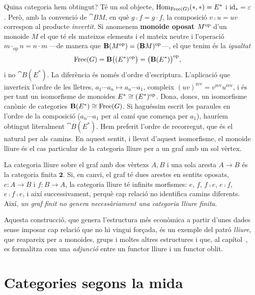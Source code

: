 \begin{exemple}
Quina categoria hem obtingut? Té un sol objecte, $\operatorname{Hom}_{\operatorname{Free}(G)}(\ast,\ast)=E^*$ i $\operatorname{id}_\ast=\varepsilon$. Però, amb la convenció de $\cat{B}M$, en què $g\comp f=g\cdot f$, la composició $v\comp u=uv$ correspon al producte \emph{invertit}. Si anomenem \textbf{monoide oposat} $M^{\mathrm{op}}$ d'un monoide $M$ el que té els mateixos elements i el mateix neutre i l'operació $m\cdot_{\mathrm{op}} n=n\cdot m$ ---de manera que $\mathbf{B}(M^{\mathrm{op}})=(\mathbf{B}M)^{\mathrm{op}}$---, el que tenim és la \emph{igualtat}
\[
\operatorname{Free}(G)=\mathbf{B}\bigl((E^*)^{\mathrm{op}}\bigr)=\bigl(\mathbf{B}(E^*)\bigr)^{\mathrm{op}},
\]
i no $\cat{B}(E^*)$. La diferència és només d'ordre d'escriptura. L'aplicació que inverteix l'ordre de les lletres, $a_1\cdots a_n\mapsto a_n\cdots a_1$, compleix $(uv)^{\mathrm{rev}}=v^{\mathrm{rev}}u^{\mathrm{rev}}$, i és per tant un isomorfisme de monoides $E^*\cong(E^*)^{\mathrm{op}}$. Dona, doncs, un isomorfisme canònic de categories $\mathbf{B}(E^*)\cong\operatorname{Free}(G)$. Si haguéssim escrit les paraules en l'ordre de la composició ($a_n\cdots a_1$ per al camí que comença per $a_1$), hauríem obtingut literalment $\cat{B}(E^*)$. Hem preferit l'ordre de recorregut, que és el natural per als camins. En aquest sentit, i llevat d'aquest isomorfisme, el monoide lliure és el cas particular de la categoria lliure per a un graf amb un sol vèrtex.
\end{exemple}

\begin{exemple}
La categoria lliure sobre el graf amb dos vèrtexs $A,B$ i una sola aresta $A\to B$ és la categoria finita $\mathbf{2}$. Si, en canvi, el graf té dues arestes en sentits oposats, $e\colon A\to B$ i $f\colon B\to A$, la categoria lliure té infinits morfismes: $e$, $f$, $f\comp e$, $e\comp f$, $e\comp f\comp e$, i així successivament, perquè cap relació no identifica camins diferents. Així, \emph{un graf finit no genera necessàriament una categoria lliure finita}.
\end{exemple}

Aquesta construcció, que genera l'estructura més econòmica a partir d'unes dades sense imposar cap relació que no hi vingui forçada, és un exemple del patró \emph{lliure}, que reapareix per a monoides, grups i moltes altres estructures i que, al capítol~, es formalitza com una \emph{adjunció} entre un functor lliure i un functor oblit.

\section{Categories segons la mida}
\label{sec:mida}

